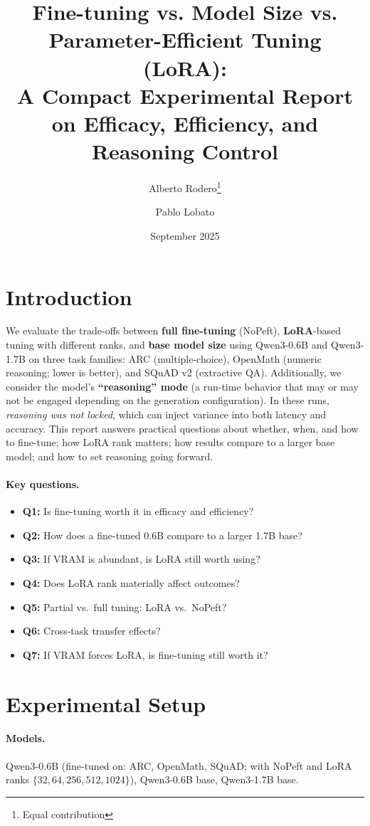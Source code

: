 \documentclass[11pt,a4paper]{article}
\title{Fine-tuning vs. Model Size vs. Parameter-Efficient Tuning (LoRA):\\
A Compact Experimental Report on Efficacy, Efficiency, and Reasoning Control}
\author{Alberto Rodero\thanks{Equal contribution} \and Pablo Lobato\footnotemark[1]}
\date{September 2025}
\begin{document}
\maketitle

\section{Introduction}
We evaluate the trade-offs between \textbf{full fine-tuning} (NoPeft), \textbf{LoRA}-based tuning with different ranks, and \textbf{base model size} using Qwen3-0.6B and Qwen3-1.7B on three task families: ARC (multiple-choice), OpenMath (numeric reasoning; lower is better), and SQuAD v2 (extractive QA). 
Additionally, we consider the model's \textbf{``reasoning'' mode} (a run-time behavior that may or may not be engaged depending on the generation configuration). In these runs, \emph{reasoning was not locked}, which can inject variance into both latency and accuracy. This report answers practical questions about whether, when, and how to fine-tune; how LoRA rank matters; how results compare to a larger base model; and how to set reasoning going forward.

\paragraph{Key questions.}
\begin{itemize}
  \item \textbf{Q1:} Is fine-tuning worth it in efficacy and efficiency?
  \item \textbf{Q2:} How does a fine-tuned 0.6B compare to a larger 1.7B base?
  \item \textbf{Q3:} If VRAM is abundant, is LoRA still worth using?
  \item \textbf{Q4:} Does LoRA rank materially affect outcomes?
  \item \textbf{Q5:} Partial vs.\ full tuning: LoRA vs.\ NoPeft?
  \item \textbf{Q6:} Cross-task transfer effects?
  \item \textbf{Q7:} If VRAM forces LoRA, is fine-tuning still worth it?
\end{itemize}

\section{Experimental Setup}
\paragraph{Models.} Qwen3-0.6B (fine-tuned on: ARC, OpenMath, SQuAD; with NoPeft and LoRA ranks $\{32,64,256,512,1024\}$), Qwen3-0.6B base, Qwen3-1.7B base.
\end{document}
